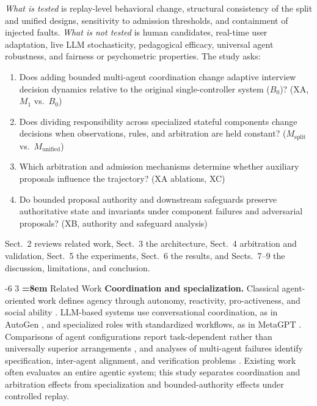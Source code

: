 \documentclass[runningheads,a4paper]{llncs}
\makeatletter
\renewcommand\section{\@startsection{section}{1}{\z@}%
                       {-6\p@ \@plus -1\p@ \@minus -1\p@}%
                       {3\p@ \@plus 1\p@ \@minus 1\p@}%
                       {\normalfont\large\bfseries\boldmath
                        \rightskip=\z@ \@plus 8em\pretolerance=10000 }}
\newcommand{\Msplit}{M_{\mathrm{split}}}
\newcommand{\Munified}{M_{\mathrm{unified}}}
\makeatother
\begin{document}
\emph{What is tested} is replay-level behavioral change, structural consistency of the split and unified designs, sensitivity to admission thresholds, and containment of injected faults. \emph{What is not tested} is human candidates, real-time user adaptation, live LLM stochasticity, pedagogical efficacy, universal agent robustness, and fairness or psychometric properties. The study asks:
\begin{enumerate}\setlength{\itemsep}{0pt}\setlength{\topsep}{2pt}
\item[RQ1] Does adding bounded multi-agent coordination change adaptive interview decision dynamics relative to the original single-controller system ($B_0$)? (XA, $M_1$ vs.\ $B_0$)
\item[RQ2] Does dividing responsibility across specialized stateful components change decisions when observations, rules, and arbitration are held constant? ($\Msplit$ vs.\ $\Munified$)
\item[RQ3] Which arbitration and admission mechanisms determine whether auxiliary proposals influence the trajectory? (XA ablations, XC)
\item[RQ4] Do bounded proposal authority and downstream safeguards preserve authoritative state and invariants under component failures and adversarial proposals? (XB, authority and safeguard analysis)
\end{enumerate}
Sect.~2 reviews related work, Sect.~3 the architecture, Sect.~4 arbitration and validation, Sect.~5 the experiments, Sect.~6 the results, and Sects.~7--9 the discussion, limitations, and conclusion.

\section{Related Work}
\textbf{Coordination and specialization.} Classical agent-oriented work defines agency through autonomy, reactivity, pro-activeness, and social ability \cite{wooldridge1995}. LLM-based systems use conversational coordination, as in AutoGen \cite{wu2023}, and specialized roles with standardized workflows, as in MetaGPT \cite{hong2024}. Comparisons of agent configurations report task-dependent rather than universally superior arrangements \cite{kim2026outgrow}, and analyses of multi-agent failures identify specification, inter-agent alignment, and verification problems \cite{cemri2025}. Existing work often evaluates an entire agentic system; this study separates coordination and arbitration effects from specialization and bounded-authority effects under controlled replay.
\end{document}
